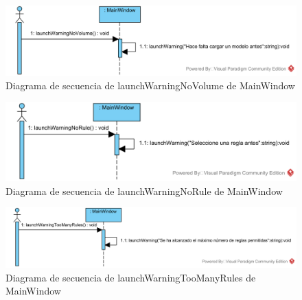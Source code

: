 \begin{figure}[H]
	\centering
	\includegraphics[width=12cm]{imagenes/diagramas/secuencia/MainWindow_LaunchWarningNoVolume}
	\caption{Diagrama de secuencia de launchWarningNoVolume de MainWindow}
	\label{fig:diagrama_secuencia_mainWindow_launchWarningNoVolume}
\end{figure}

\begin{figure}[H]
	\centering
	\includegraphics[width=12cm]{imagenes/diagramas/secuencia/MainWindow_LaunchWarningNoRule}
	\caption{Diagrama de secuencia de launchWarningNoRule de MainWindow}
	\label{fig:diagrama_secuencia_mainWindow_launchWarningNoRule}
\end{figure}

\begin{figure}[H]
	\centering
	\includegraphics[width=12cm]{imagenes/diagramas/secuencia/MainWindow_LaunchWarningTooManyRules}
	\caption{Diagrama de secuencia de launchWarningTooManyRules de MainWindow}
	\label{fig:diagrama_secuencia_mainWindow_launchWarningTooManyRules}
\end{figure}